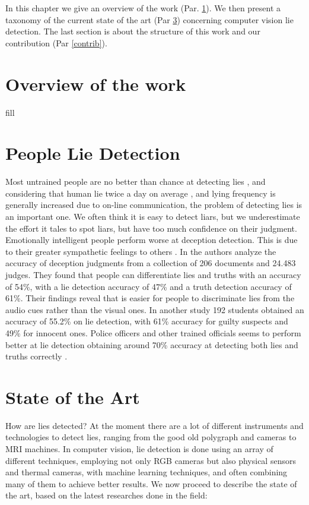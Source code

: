 In this chapter we give an overview of the work (Par. \ref{overview}). We then present a taxonomy of the current state of the art (Par \ref{sota}) concerning computer vision lie detection. The last section is about the structure of this work and our contribution (Par \ref{contrib}).

\pagebreak

\section{Overview of the work} \label{overview}
fill

\pagebreak

\section{People Lie Detection} \label{pplLieDet}
Most untrained people are no better than chance at detecting lies \cite{Porter2012SecretsAL},
and considering that human lie twice a day on average \cite{LyingEverydayLife}, and  lying frequency is generally increased  \cite{DigitalDeception} due to on-line communication, the problem of detecting lies is an important one.
We often think it is easy to detect liars, but we underestimate the effort it tales to spot liars, but have too much confidence on their judgment\cite{VrijDLD}.
Emotionally intelligent people perform worse at deception detection. This is due to their greater sympathetic feelings to others \cite{EmotionallyIntelligent}.
In \cite{BondDePauloAccuracy} the authors analyze the accuracy of deception judgments from a collection of 206 documents and 24.483 judges. They found that people can differentiate lies and truths with an accuracy of 54\%, with a lie detection accuracy of 47\% and a truth detection accuracy of 61\%. Their findings reveal that is easier for people to discriminate lies from the audio cues rather than the visual ones. In another study \cite{HartwigGranhag} 192 students obtained an accuracy of 55.2\% on lie detection, with 61\% accuracy for guilty suspects and 49\% for innocent ones. Police officers and other trained officials seems to perform better at lie detection obtaining around 70\% accuracy at detecting both lies and truths correctly \cite{VrijPoliceDetect}.


\pagebreak

\section{State of the Art} \label{sota}
How are lies detected? At the moment there are a lot of different instruments and technologies to detect lies, ranging from the good old polygraph and cameras to MRI machines. 
In computer vision, lie detection is done using an array of different techniques, employing not only RGB cameras but also physical sensors and thermal cameras, with machine learning techniques, and often combining many of them to achieve better results. 
We now proceed to describe the state of the art, based on the latest researches done in the field:

